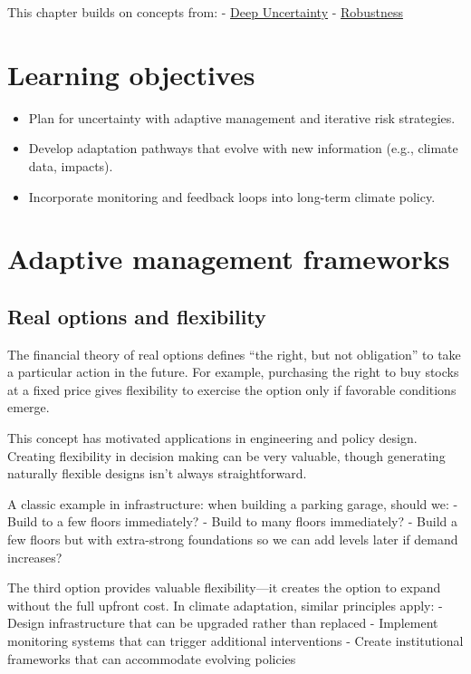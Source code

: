 \documentclass[
  letterpaper,
  DIV=11,
  numbers=noendperiod]{scrreprt}
\providecommand{\tightlist}{%
  \setlength{\itemsep}{0pt}\setlength{\parskip}{0pt}}
\begin{document}
This chapter builds on concepts from: -
\href{./chapters/risk/deep-uncertainty.qmd}{Deep Uncertainty} -
\href{./chapters/risk/robustness.qmd}{Robustness}

\section*{Learning objectives}\label{learning-objectives-19}


\begin{itemize}
\tightlist
\item
  Plan for uncertainty with adaptive management and iterative risk
  strategies.
\item
  Develop adaptation pathways that evolve with new information (e.g.,
  climate data, impacts).
\item
  Incorporate monitoring and feedback loops into long-term climate
  policy.
\end{itemize}

\section{Adaptive management
frameworks}\label{adaptive-management-frameworks}

\subsection{Real options and
flexibility}\label{real-options-and-flexibility}

The financial theory of real options defines ``the right, but not
obligation'' to take a particular action in the future. For example,
purchasing the right to buy stocks at a fixed price gives flexibility to
exercise the option only if favorable conditions emerge.

This concept has motivated applications in engineering and policy
design. Creating flexibility in decision making can be very valuable,
though generating naturally flexible designs isn't always
straightforward.

A classic example in infrastructure: when building a parking garage,
should we: - Build to a few floors immediately? - Build to many floors
immediately? - Build a few floors but with extra-strong foundations so
we can add levels later if demand increases?

The third option provides valuable flexibility---it creates the option
to expand without the full upfront cost. In climate adaptation, similar
principles apply: - Design infrastructure that can be upgraded rather
than replaced - Implement monitoring systems that can trigger additional
interventions - Create institutional frameworks that can accommodate
evolving policies
\end{document}
